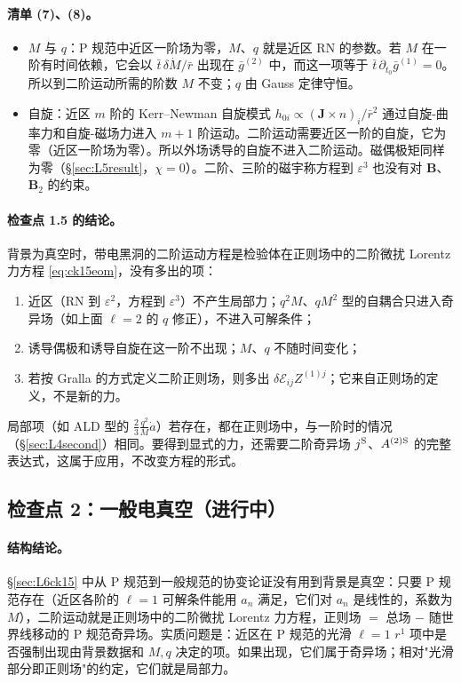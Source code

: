 \documentclass[11pt,a4paper]{ctexart}
\numberwithin{equation}{section}
\begin{document}
\paragraph{清单 (7)、(8)。}
\begin{itemize}
\item $M$ 与 $q$：P 规范中近区一阶场为零，$M$、$q$ 就是近区 RN 的参数。若 $M$ 在一阶有时间依赖，它会以 $\bar t\,\delta\dot M/\bar r$ 出现在 $\bar g^{(2)}$ 中，而这一项等于 $\bar t\,\partial_{t_0}\bar g^{(1)}=0$。所以到二阶运动所需的阶数 $M$ 不变；$q$ 由 Gauss 定律守恒。
\item 自旋：近区 $m$ 阶的 Kerr--Newman 自旋模式 $h_{0i}\propto(\boldsymbol J\times n)_i/\bar r^2$ 通过自旋-曲率力和自旋-磁场力进入 $m+1$ 阶运动。二阶运动需要近区一阶的自旋，它为零（近区一阶场为零）。所以外场诱导的自旋不进入二阶运动。磁偶极矩同样为零（\S\ref{sec:L5result}，$\chi=0$）。二阶、三阶的磁宇称方程到 $\varepsilon^3$ 也没有对 $\boldsymbol B$、$\boldsymbol B_2$ 的约束。
\end{itemize}

\paragraph{检查点 1.5 的结论。}背景为真空时，带电黑洞的二阶运动方程是检验体在正则场中的二阶微扰 Lorentz 力方程 \eqref{eq:ck15eom}，没有多出的项：
\begin{enumerate}
\item 近区（RN 到 $\varepsilon^2$，方程到 $\varepsilon^3$）不产生局部力；$q^2M$、$qM^2$ 型的自耦合只进入奇异场（如上面 $\ell=2$ 的 $q$ 修正），不进入可解条件；
\item 诱导偶极和诱导自旋在这一阶不出现；$M$、$q$ 不随时间变化；
\item 若按 Gralla 的方式定义二阶正则场，则多出 $\delta\mathcal E_{ij}Z^{(1)j}$；它来自正则场的定义，不是新的力。
\end{enumerate}
局部项（如 ALD 型的 $\tfrac23\tfrac{q^2}{M}\dot a$）若存在，都在正则场中，与一阶时的情况（\S\ref{sec:L4second}）相同。要得到显式的力，还需要二阶奇异场 $j^{\rm S}$、$A^{(2){\rm S}}$ 的完整表达式，这属于应用，不改变方程的形式。

\subsection{检查点 2：一般电真空（进行中）}
\label{sec:L6ck2}

\paragraph{结构结论。}\S\ref{sec:L6ck15} 中从 P 规范到一般规范的协变论证没有用到背景是真空：只要 P 规范存在（近区各阶的 $\ell=1$ 可解条件能用 $a_n$ 满足，它们对 $a_n$ 是线性的，系数为 $M$），二阶运动就是正则场中的二阶微扰 Lorentz 力方程，正则场 $=$ 总场 $-$ 随世界线移动的 P 规范奇异场。实质问题是：近区在 P 规范的光滑 $\ell=1$ $r^1$ 项中是否强制出现由背景数据和 $M,q$ 决定的项。如果出现，它们属于奇异场；相对"光滑部分即正则场"的约定，它们就是局部力。
\end{document}
